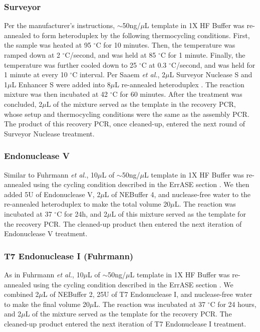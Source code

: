 \documentclass[letterpaper,12pt]{article}
\begin{document}
\subsubsection*{Surveyor}
Per the manufacturer’s instructions, $\sim$50ng/$\mu$L template in 1X HF Buffer was re-annealed to form heteroduplex by the following thermocycling conditions. First, the sample was heated at 95 $^{\circ}$C for 10 minutes. Then, the temperature was ramped down at 2 $^{\circ}$C/second, and was held at 85 $^{\circ}$C for 1 minute. Finally, the temperature was further cooled down to 25 $^{\circ}$C at 0.3 $^{\circ}$C/second, and was held for 1 minute at every 10 $^{\circ}$C interval. Per Saaem \textit{et al.}, 2$\mu$L Surveyor Nuclease S and 1$\mu$L Enhancer S were added into 8$\mu$L re-annealed heteroduplex \cite{saaem2012}. The reaction mixture was then incubated at 42 $^{\circ}$C for 60 minutes. After the treatment was concluded, 2$\mu$L of the mixture served as the template in the recovery PCR, whose setup and thermocycling conditions were the same as the assembly PCR. The product of this recovery PCR, once cleaned-up, entered the next round of Surveyor Nuclease treatment.

\subsubsection*{Endonuclease V}
Similar to Fuhrmann \textit{et al.}, 10$\mu$L of $\sim$50ng/$\mu$L template in 1X HF Buffer was re-annealed using the cycling condition described in the ErrASE section \cite{fuhrmann2005}. We then added 5U of Endonuclease V, 2$\mu$L of NEBuffer 4, and nuclease-free water to the re-annealed heteroduplex to make the total volume 20$\mu$L. The reaction was incubated at 37 $^{\circ}$C for 24h, and 2$\mu$L of this mixture served as the template for the recovery PCR. The cleaned-up product then entered the next iteration of Endonuclease V treatment.

\subsubsection*{T7 Endonuclease I (Fuhrmann)}
As in Fuhrmann \textit{et al.}, 10$\mu$L of $\sim$50ng/$\mu$L template in 1X HF Buffer was re-annealed using the cycling condition described in the ErrASE section \cite{fuhrmann2005}. We combined 2$\mu$L of NEBuffer 2, 25U of T7 Endonuclease I, and nuclease-free water to make the final volume 20$\mu$L. The reaction was incubated at 37 $^{\circ}$C for 24 hours, and 2$\mu$L of the mixture served as the template for the recovery PCR. The cleaned-up product entered the next iteration of T7 Endonuclease I treatment.
\end{document}
